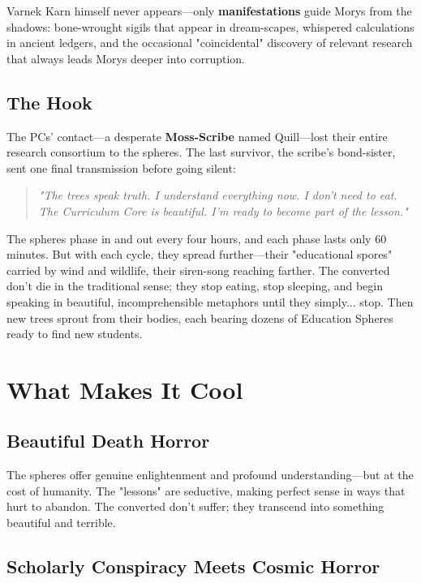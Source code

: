 \documentclass[11pt,twoside]{book}
\begin{document}
Varnek Karn himself never appears---only \textbf{manifestations} guide Morys from the shadows: bone-wrought sigils that appear in dream-scapes, whispered calculations in ancient ledgers, and the occasional "coincidental" discovery of relevant research that always leads Morys deeper into corruption.

\section*{The Hook}

The PCs' contact---a desperate \textbf{Moss-Scribe} named Quill---lost their entire research consortium to the spheres. The last survivor, the scribe's bond-sister, sent one final transmission before going silent:

\begin{quote}
    \emph{"The trees speak truth. I understand everything now. I don't need to eat. The Curriculum Core is beautiful. I'm ready to become part of the lesson."}
\end{quote}

The spheres phase in and out every four hours, and each phase lasts only 60 minutes. But with each cycle, they spread further---their "educational spores" carried by wind and wildlife, their siren-song reaching farther. The converted don't die in the traditional sense; they stop eating, stop sleeping, and begin speaking in beautiful, incomprehensible metaphors until they simply... stop. Then new trees sprout from their bodies, each bearing dozens of Education Spheres ready to find new students.

\chapter{What Makes It Cool}

\section*{Beautiful Death Horror}

The spheres offer genuine enlightenment and profound understanding---but at the cost of humanity. The "lessons" are seductive, making perfect sense in ways that hurt to abandon. The converted don't suffer; they transcend into something beautiful and terrible.

\section*{Scholarly Conspiracy Meets Cosmic Horror}
\end{document}
